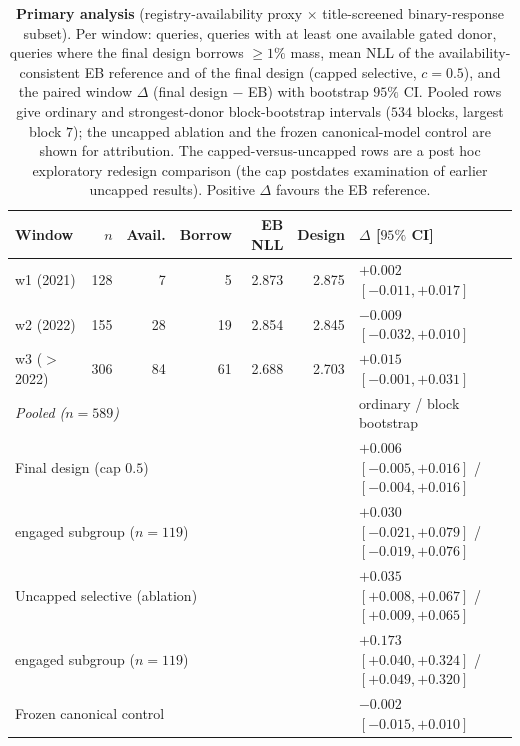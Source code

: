 \documentclass[11pt]{article}
\begin{document}
\begin{table}[htbp]
\centering
\caption{\textbf{Primary analysis} (registry-availability proxy
$\times$ title-screened binary-response subset). Per window: queries, queries with at
least one available gated donor, queries where the final design borrows
$\ge 1\%$ mass, mean NLL of the availability-consistent EB reference and of
the final design (capped selective, $c = 0.5$), and the paired
window $\Delta$ (final design $-$ EB) with bootstrap $95\%$ CI. Pooled rows
give ordinary and strongest-donor block-bootstrap intervals ($534$ blocks,
largest block $7$); the uncapped ablation and the frozen canonical-model
control are shown for attribution. The capped-versus-uncapped rows are a
post hoc exploratory redesign comparison (the cap postdates examination
of earlier uncapped results). Positive $\Delta$ favours the EB
reference.}
\label{tab:primary}
\small
\setlength{\tabcolsep}{4.5pt}
\begin{tabular}{lrrrrrl}
\toprule
Window & $n$ & Avail. & Borrow & EB NLL & Design & $\Delta$ [$95\%$ CI] \\
\midrule
w1 (2021) & 128 & 7 & 5 & 2.873 & 2.875 & $+0.002$ $[-0.011,+0.017]$ \\
w2 (2022) & 155 & 28 & 19 & 2.854 & 2.845 & $-0.009$ $[-0.032,+0.010]$ \\
w3 ($>$2022) & 306 & 84 & 61 & 2.688 & 2.703 & $+0.015$ $[-0.001,+0.031]$ \\
\midrule
\multicolumn{4}{l}{\emph{Pooled ($n=589$)}} & & & ordinary / block bootstrap \\
\multicolumn{6}{l}{Final design (cap $0.5$)} & $+0.006$ $[-0.005,+0.016]$ / $[-0.004,+0.016]$ \\
\multicolumn{6}{l}{\quad engaged subgroup ($n{=}119$)} & $+0.030$ $[-0.021,+0.079]$ / $[-0.019,+0.076]$ \\
\multicolumn{6}{l}{Uncapped selective (ablation)} & $+0.035$ $[+0.008,+0.067]$ / $[+0.009,+0.065]$ \\
\multicolumn{6}{l}{\quad engaged subgroup ($n{=}119$)} & $+0.173$ $[+0.040,+0.324]$ / $[+0.049,+0.320]$ \\
\multicolumn{6}{l}{Frozen canonical control} & $-0.002$ $[-0.015,+0.010]$ \\
\bottomrule
\end{tabular}
\end{table}
\end{document}
